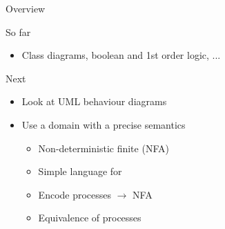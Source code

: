 \documentclass[aspectratio=169]{beamer}
\begin{document}
\begin{slide}{Overview}
\begin{block}{So far}
\begin{itemize}
  \item Class diagrams, boolean and 1st order logic, ...
\end{itemize}
\end{block}

\begin{block}{Next}
\begin{itemize}
  \item Look at UML \alert{behaviour} diagrams
  \item Use a domain with a \alert{precise semantics}
  \begin{itemize}
    \item Non-deterministic finite  (NFA)
    \item Simple language for 
    \item Encode processes $\to$ NFA
    \item Equivalence of processes
  \end{itemize}
\end{itemize}
\end{block}

~~

\end{slide}
\end{document}
